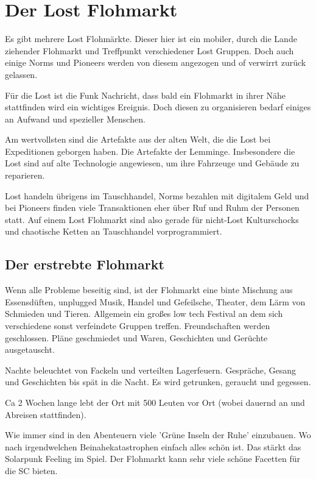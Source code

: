 
\chapter{Der Lost Flohmarkt}

Es gibt mehrere Lost Flohmärkte. Dieser hier ist ein mobiler, durch die Lande ziehender Flohmarkt und Treffpunkt verschiedener Lost Gruppen. Doch auch einige Norms und Pioneers werden von diesem angezogen und of verwirrt zurück gelassen.

Für die Lost ist die Funk Nachricht, dass bald ein Flohmarkt in ihrer Nähe stattfinden wird ein wichtiges Ereignis. Doch diesen zu organisieren bedarf einiges an Aufwand und spezieller Menschen.

Am wertvollsten sind die Artefakte aus der alten Welt, die die Lost bei Expeditionen geborgen haben. Die Artefakte der Lemminge. Insbesondere die Lost sind auf alte Technologie angewiesen, um ihre Fahrzeuge und Gebäude zu reparieren.

Lost handeln übrigens im Tauschhandel, Norms bezahlen mit digitalem Geld und bei Pioneers finden viele Transaktionen eher über Ruf und Ruhm der Personen statt. Auf einem Lost Flohmarkt sind also gerade für nicht-Lost Kulturschocks und chaotische Ketten an Tauschhandel vorprogrammiert.

\section{Der erstrebte Flohmarkt}

Wenn alle Probleme beseitig sind, ist der Flohmarkt eine binte Mischung aus Essensdüften, unplugged Musik, Handel und Gefeilsche, Theater, dem Lärm von Schmieden und Tieren. Allgemein ein großes low tech Festival an dem sich verschiedene sonst verfeindete Gruppen treffen.
Freundschaften werden geschlossen. Pläne geschmiedet und Waren, Geschichten und Gerüchte ausgetauscht.

Nachte beleuchtet von Fackeln und verteilten Lagerfeuern. Gespräche, Gesang und Geschichten bis spät in die Nacht. Es wird getrunken, geraucht und gegessen.

Ca 2 Wochen lange lebt der Ort mit 500 Leuten vor Ort (wobei dauernd an und Abreisen stattfinden).

Wie immer sind in den Abenteuern viele 'Grüne Inseln der Ruhe' einzubauen. Wo nach irgendwelchen Beinahekatastrophen einfach alles schön ist. Das stärkt das Solarpunk Feeling im Spiel. Der Flohmarkt kann sehr viele schöne Facetten für die SC bieten.

